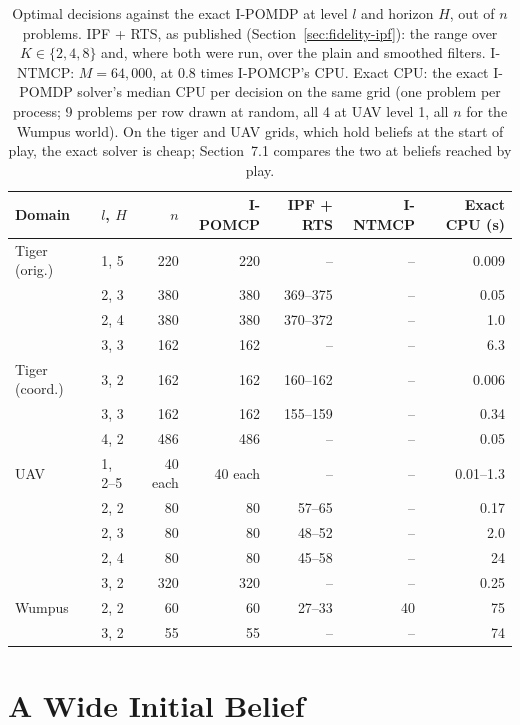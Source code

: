 \documentclass{article}
\begin{document}
\begin{table}[h]
\centering
\footnotesize
\setlength{\tabcolsep}{3pt}
\begin{tabular}{@{}llrrrrr@{}}
\toprule
Domain & $l$, $H$ & $n$ & I-POMCP & IPF + RTS & I-NTMCP & Exact CPU (s) \\
\midrule
Tiger (orig.) & 1, 5 & 220 & 220 & -- & -- & 0.009 \\
 & 2, 3 & 380 & 380 & 369--375 & -- & 0.05 \\
 & 2, 4 & 380 & 380 & 370--372 & -- & 1.0 \\
 & 3, 3 & 162 & 162 & -- & -- & 6.3 \\
Tiger (coord.) & 3, 2 & 162 & 162 & 160--162 & -- & 0.006 \\
 & 3, 3 & 162 & 162 & 155--159 & -- & 0.34 \\
 & 4, 2 & 486 & 486 & -- & -- & 0.05 \\
UAV & 1, 2--5 & 40 each & 40 each & -- & -- & 0.01--1.3 \\
 & 2, 2 & 80 & 80 & 57--65 & -- & 0.17 \\
 & 2, 3 & 80 & 80 & 48--52 & -- & 2.0 \\
 & 2, 4 & 80 & 80 & 45--58 & -- & 24 \\
 & 3, 2 & 320 & 320 & -- & -- & 0.25 \\
Wumpus & 2, 2 & 60 & 60 & 27--33 & 40 & 75 \\
 & 3, 2 & 55 & 55 & -- & -- & 74 \\
\bottomrule
\end{tabular}
\caption{Optimal decisions against the exact I-POMDP at level $l$ and horizon $H$, out of $n$ problems. IPF + RTS, as published (Section~\ref{sec:fidelity-ipf}): the range over $K \in \{2, 4, 8\}$ and, where both were run, over the plain and smoothed filters. I-NTMCP: $M = 64{,}000$, at 0.8 times I-POMCP's CPU. Exact CPU: the exact I-POMDP solver's median CPU per decision on the same grid (one problem per process; 9 problems per row drawn at random, all 4 at UAV level 1, all $n$ for the Wumpus world). On the tiger and UAV grids, which hold beliefs at the start of play, the exact solver is cheap; Section~7.1 compares the two at beliefs reached by play.}
\label{tab:decisions-supp}
\end{table}

\section{A Wide Initial Belief}
\label{sec:wide}
\end{document}
